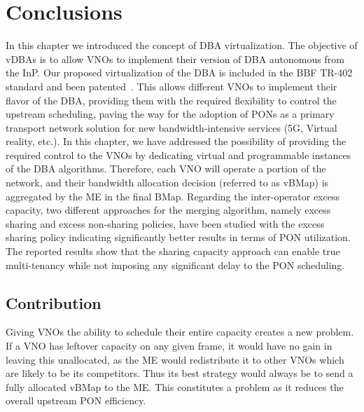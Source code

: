 \section{Conclusions}


In this chapter we introduced the concept of \ac{DBA} virtualization. The objective of \acp{vDBA} is to allow \acp{VNO} to implement their version of \ac{DBA} autonomous from the \ac{InP}. %
Our proposed virtualization of the \ac{DBA} is included in the \ac{BBF} TR-402 standard and been patented~\cite{Nima-vDBA-patent}. This allows different \acp{VNO} to implement their flavor of the \ac{DBA}, providing them with the required flexibility to control the upstream scheduling, paving the way for the adoption of \acp{PON} as a primary transport network solution for new bandwidth-intensive services (\ac{5G}, Virtual reality, etc.). In this chapter, we have addressed the possibility of providing the required control to the \acp{VNO} by dedicating virtual and programmable instances of the \ac{DBA} algorithms. Therefore, each \ac{VNO} will operate a portion of the network, and their bandwidth allocation decision (referred to as \ac{vBMap}) is aggregated by the \ac{ME} in the final \ac{BMap}. Regarding the inter-operator excess capacity, two different approaches for the merging algorithm, namely excess sharing and excess non-sharing policies, have been studied with the excess sharing policy indicating significantly better results in terms of \ac{PON} utilization. The reported results show that the sharing capacity approach can enable true multi-tenancy while not imposing any significant delay to the \ac{PON} scheduling. 

\subsection{Contribution}
Giving \acp{VNO} the ability to schedule their entire capacity creates a new problem. If a \ac{VNO} has leftover capacity on any given frame, it would have no gain in leaving this unallocated, as the \ac{ME} would redistribute it to other \acp{VNO} which are likely to be its competitors. Thus its best strategy would always be to send a fully allocated \ac{vBMap} to the \ac{ME}. This constitutes a problem as it reduces the overall upstream \ac{PON} efficiency.


